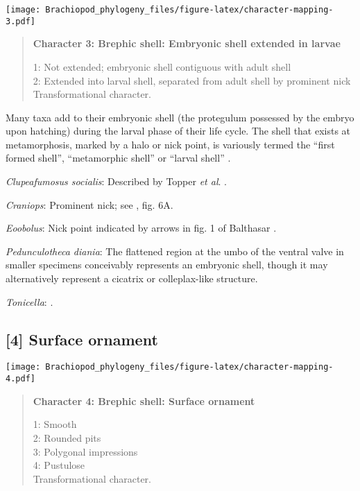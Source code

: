 \documentclass[openany]{book}
\theoremstyle{definition}
\theoremstyle{definition}
\theoremstyle{definition}
\theoremstyle{remark}
\begin{document}
\texttt{[image: Brachiopod\_phylogeny\_files/figure-latex/character-mapping-3.pdf]}

\begin{quote}
\textbf{Character 3: Brephic shell: Embryonic shell extended in larvae}

1: Not extended; embryonic shell contiguous with adult shell\\
2: Extended into larval shell, separated from adult shell by prominent
nick\\
Transformational character.
\end{quote}

Many taxa add to their embryonic shell (the protegulum possessed by the
embryo upon hatching) during the larval phase of their life cycle. The
shell that exists at metamorphosis, marked by a halo or nick point, is
variously termed the ``first formed shell'', ``metamorphic shell'' or
``larval shell'' \citep{Bassett2017Earliestontogeny}.

\hypertarget{Clupeafumosus_socialis-coding-3}{}
\emph{Clupeafumosus socialis}: Described by Topper \emph{et al}.
\citeyearpar{Topper2013Reappraisalof}.

\hypertarget{Craniops-coding-3}{}
\emph{Craniops}: Prominent nick; see \citet{Freeman1999Changesin}, fig.
6A.

\hypertarget{Eoobolus-coding-3}{}
\emph{Eoobolus}: Nick point indicated by arrows in fig. 1 of Balthasar
\citeyearpar{Balthasar2009Thebrachiopod}.

\hypertarget{Pedunculotheca_diania-coding-3}{}
\emph{Pedunculotheca diania}: The flattened region at the umbo of the
ventral valve in smaller specimens conceivably represents an embryonic
shell, though it may alternatively represent a cicatrix or
colleplax-like structure.

\hypertarget{Tonicella-coding-3}{}
\emph{Tonicella}: \citet{Wanninger2002C}.

\subsection*{{[}4{]} Surface ornament}\label{surface-ornament}

\texttt{[image: Brachiopod\_phylogeny\_files/figure-latex/character-mapping-4.pdf]}

\begin{quote}
\textbf{Character 4: Brephic shell: Surface ornament}

1: Smooth\\
2: Rounded pits\\
3: Polygonal impressions\\
4: Pustulose\\
Transformational character.
\end{quote}
\end{document}
